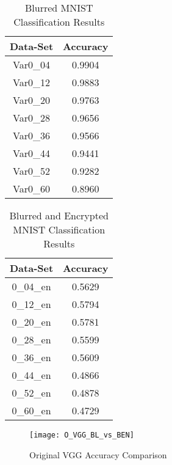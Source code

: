 \documentclass[12pt, titlepage]{article}
\begin{document}
\begin{table}[!h]
	\begin{center}
		\begin{tabular}{| c | c |}
			\hline
			\textbf{Data-Set} & \textbf{Accuracy}\\
			\hline
			Var0\_04 & 0.9904\\
			\hline
			Var0\_12 & 0.9883\\
			\hline
			Var0\_20 & 0.9763\\
			\hline
			Var0\_28 & 0.9656\\
			\hline
			Var0\_36 & 0.9566\\
			\hline
			Var0\_44 & 0.9441\\
			\hline
			Var0\_52 & 0.9282\\
			\hline
			Var0\_60 & 0.8960\\
			\hline
		\end{tabular}
		\caption{Blurred MNIST Classification Results}
		\label{table:basicVGG_Blurred}
	\end{center}
\end{table}

\begin{table}[!h]
	\begin{center}
		\begin{tabular}{| c | c |}
			\hline
			\textbf{Data-Set} & \textbf{Accuracy}\\
			\hline
			0\_04\_en & 0.5629\\
			\hline
			0\_12\_en & 0.5794\\
			\hline
			0\_20\_en & 0.5781\\
			\hline
			0\_28\_en & 0.5599\\
			\hline
			0\_36\_en & 0.5609\\
			\hline
			0\_44\_en & 0.4866\\
			\hline
			0\_52\_en & 0.4878\\
			\hline
			0\_60\_en & 0.4729\\
			\hline
		\end{tabular}
		\caption{Blurred and Encrypted MNIST Classification Results}
		\label{table:basicVGG_BlurredEncrypted}
	\end{center}
\end{table}

\begin{figure}[h!]
	\begin{center}
		\texttt{[image: O\_VGG\_BL\_vs\_BEN]}
		\caption{Original VGG Accuracy Comparison}
		\label{GRAPH_OriginalVGG}
	\end{center}
\end{figure} 
\end{document}
